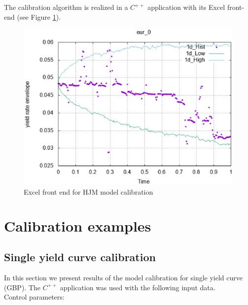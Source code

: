 \documentclass[10pt]{article}
\begin{document}
The calibration algorithm is realized in a $C^{++}$ application with its Excel front-end (see Figure \ref{fr_end}).
\begin{figure}[H]
\centering
\includegraphics [width=1\textwidth]{blank.eps}
\caption{Excel front end for HJM model calibration}
\label{fr_end}
\end{figure}



\section{Calibration examples} \label{hjm_ex}



\subsection{Single yield curve calibration}

In this section we present results of the model calibration for single yield curve (GBP). The $C^{++}$ application was used with the following input data. \\
Control parameters:
\end{document}
